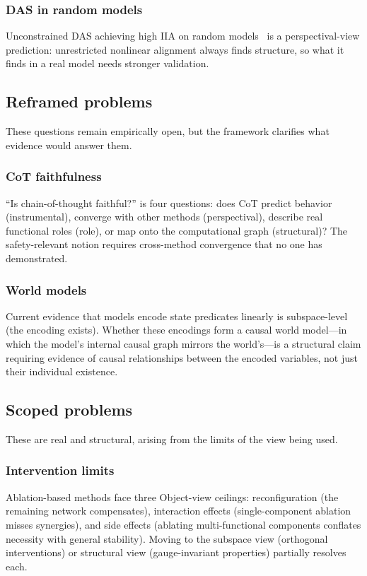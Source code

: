 \documentclass{article}
\begin{document}
\subsubsection{DAS in random models}
Unconstrained DAS achieving high IIA on random
models~\citep{sutter2025} is a perspectival-view prediction:
unrestricted nonlinear alignment always finds structure, so
what it finds in a real model needs stronger validation.

\subsection{Reframed problems}

These questions remain empirically open, but the framework clarifies
what evidence would answer them.

\subsubsection{CoT faithfulness}
``Is chain-of-thought faithful?'' is four questions: does CoT predict
behavior (instrumental), converge with other methods (perspectival),
describe real functional roles (role), or map onto the computational
graph (structural)?  The safety-relevant notion requires cross-method
convergence that no one has demonstrated.

\subsubsection{World models}
Current evidence that models encode state predicates linearly is
subspace-level (the encoding exists).  Whether these encodings form a
causal world model---in which the model's internal causal graph mirrors
the world's---is a structural claim requiring evidence of causal
relationships between the encoded variables, not just their individual
existence.

\subsection{Scoped problems}

These are real and structural, arising from the limits of the view
being used.

\subsubsection{Intervention limits}
Ablation-based methods face three Object-view ceilings: reconfiguration
(the remaining network compensates), interaction effects (single-component
ablation misses synergies), and side effects (ablating multi-functional
components conflates necessity with general stability).  Moving to the
subspace view (orthogonal interventions) or structural view
(gauge-invariant properties) partially resolves each.
\end{document}
